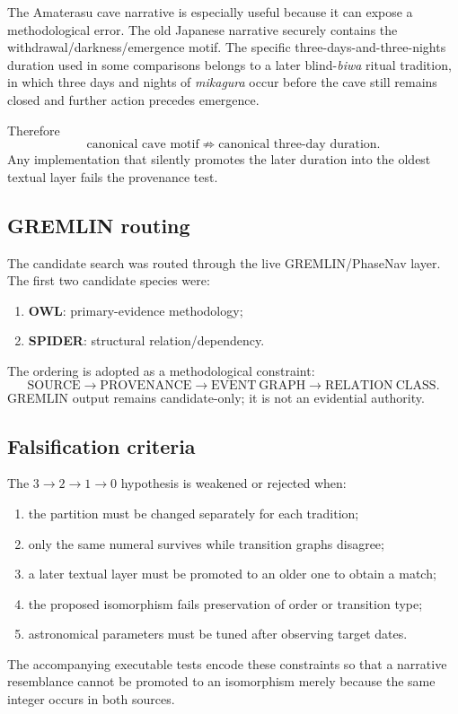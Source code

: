 The Amaterasu cave narrative is especially useful because it can expose a
methodological error. The old Japanese narrative securely contains the
withdrawal/darkness/emergence motif. The specific three-days-and-three-nights
duration used in some comparisons belongs to a later blind-\emph{biwa}
ritual tradition, in which three days and nights of \emph{mikagura} occur
before the cave still remains closed and further action precedes emergence.

Therefore
\[
\text{canonical cave motif}
\not\Rightarrow
\text{canonical three-day duration}.
\]
Any implementation that silently promotes the later duration into the
oldest textual layer fails the provenance test.

\subsection{GREMLIN routing}

The candidate search was routed through the live GREMLIN/PhaseNav layer.
The first two candidate species were:
\begin{enumerate}
  \item \textbf{OWL}: primary-evidence methodology;
  \item \textbf{SPIDER}: structural relation/dependency.
\end{enumerate}
The ordering is adopted as a methodological constraint:
\[
\mathrm{SOURCE}
\rightarrow
\mathrm{PROVENANCE}
\rightarrow
\mathrm{EVENT\ GRAPH}
\rightarrow
\mathrm{RELATION\ CLASS}.
\]
GREMLIN output remains candidate-only; it is not an evidential authority.

\subsection{Falsification criteria}

The \(3\to2\to1\to0\) hypothesis is weakened or rejected when:
\begin{enumerate}
  \item the partition must be changed separately for each tradition;
  \item only the same numeral survives while transition graphs disagree;
  \item a later textual layer must be promoted to an older one to obtain a
        match;
  \item the proposed isomorphism fails preservation of order or transition
        type;
  \item astronomical parameters must be tuned after observing target dates.
\end{enumerate}

The accompanying executable tests encode these constraints so that a
narrative resemblance cannot be promoted to an isomorphism merely because
the same integer occurs in both sources.
